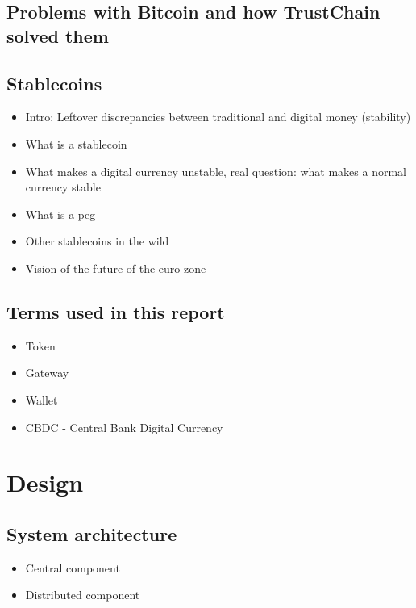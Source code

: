 \documentclass[whitelogo]{tudelft-report}
\providecommand{\tightlist}{%
  \setlength{\itemsep}{0pt}\setlength{\parskip}{0pt}}
\begin{document}
\section{Problems with Bitcoin and how TrustChain solved
them}\label{problems-with-bitcoin-and-how-trustchain-solved-them}

\section{Stablecoins}\label{stablecoins}

\begin{itemize}
\tightlist
\item
  Intro: Leftover discrepancies between traditional and digital money
  (stability)
\item
  What is a stablecoin
\item
  What makes a digital currency unstable, real question: what makes a
  normal currency stable
\item
  What is a peg
\item
  Other stablecoins in the wild
\item
  Vision of the future of the euro zone
\end{itemize}

\section{Terms used in this report}\label{terms-used-in-this-report}

\begin{itemize}
\tightlist
\item
  Token
\item
  Gateway
\item
  Wallet
\item
  CBDC - Central Bank Digital Currency
\end{itemize}

\chapter{Design}\label{design}

\section{System architecture}\label{system-architecture}

\begin{itemize}
\tightlist
\item
  Central component
\item
  Distributed component
\end{itemize}
\end{document}
